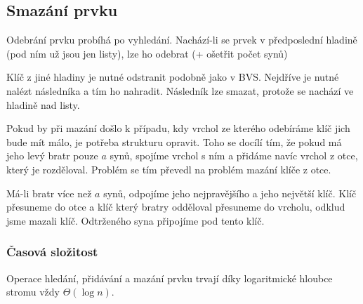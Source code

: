 
\subsection{Smazání prvku}

Odebrání prvku probíhá po vyhledání.
Nachází-li se prvek v předposlední hladině (pod ním už jsou jen listy), lze ho odebrat (+ ošetřit počet synů)

Klíč z jiné hladiny je nutné odstranit podobně jako v BVS.
Nejdříve je nutné nalézt následníka a tím ho nahradit.
Následník lze smazat, protože se nachází ve hladině nad listy.

Pokud by při mazání došlo k případu, kdy vrchol ze kterého odebíráme klíč jich bude mít málo, je potřeba strukturu opravit.
Toho se docílí tím, že pokud má jeho levý bratr pouze $a$ synů, spojíme vrchol s ním a přidáme navíc vrchol z otce, který je rozděloval.
Problém se tím převedl na problém mazání klíče z otce.

Má-li bratr více než $a$ synů, odpojíme jeho nejpravějšího a jeho největší klíč.
Klíč přesuneme do otce a klíč který bratry odděloval přesuneme do vrcholu, odklud jsme mazali klíč.
Odtrženého syna připojíme pod tento klíč.

\subsubsection{Časová složitost}

Operace hledání, přidávání a mazání prvku trvají díky logaritmické hloubce stromu vždy $\Theta(\log n)$.
